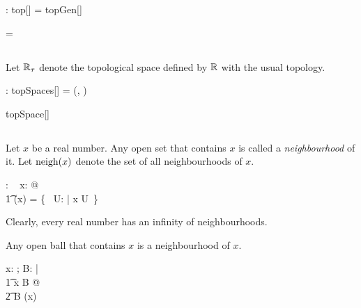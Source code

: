 \documentclass[11pt, oneside]{article}
\begin{document}
\begin{axdef}
	\tauR: top[\R]
\where
	\tauR = topGen[\R] \ballsR
\end{axdef}

\begin{remark}

\begin{zed}
	\tauR = \openR
\end{zed}

\end{remark}

\subsection{}

Let $\mathbb{R}_\tau$ denote the topological space defined by $\mathbb{R}$ with the usual topology.

\begin{axdef}
	\Rtau: topSpaces[\R]
\where
	\Rtau = (\R, \tauR)
\end{axdef}

\begin{example}

\begin{zed}
	\Rtau \in topSpace[\R]
\end{zed}

\end{example}

\subsection{}

Let $x$ be a real number.
Any open set that contains $x$ is called a {\it neighbourhood} of it.
Let $\operatorname{neigh}(x)$ denote the set of all neighbourhoods of $x$.

\begin{axdef}
	\neighR: \R \fun \family~\R
\where
	\forall x: \R @ \\
	\t1	\neighR(x) = \{~ U: \openR | x \in U~\}
\end{axdef}

Clearly, every real number has an infinity of neighbourhoods.

\begin{remark}
Any open ball that contains $x$ is a neighbourhood of $x$.

\begin{zed}
	\forall x: \R; B: \ballsR | \\
	\t1	x \in B @ \\
	\t2		B \in \neighR(x)
\end{zed}

\end{remark}
\end{document}
